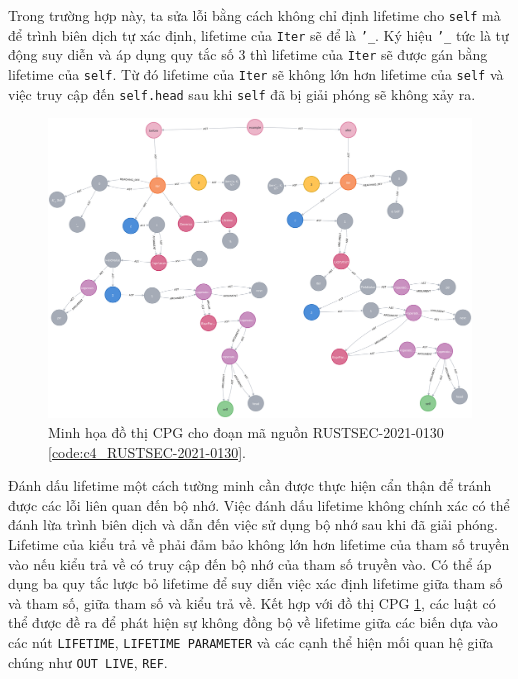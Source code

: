 Trong trường hợp này, ta sửa lỗi bằng cách không chỉ định lifetime cho \texttt{self} mà để trình biên dịch tự xác định, lifetime của \texttt{Iter} sẽ để là \texttt{'\_}.
Ký hiệu \texttt{'\_} tức là tự động suy diễn và áp dụng quy tắc số 3 thì lifetime của \texttt{Iter} sẽ được gán bằng lifetime của \texttt{self}.
Từ đó lifetime của \texttt{Iter} sẽ không lớn hơn lifetime của \texttt{self} và việc truy cập đến \texttt{self.head} sau khi \texttt{self} đã bị giải phóng sẽ không xảy ra.

\begin{figure}[H]
    \includegraphics[width=1\columnwidth]{figures/c4/c4_RUSTSEC-2021-0130.png}
    \centering
    \caption{Minh họa đồ thị CPG cho đoạn mã nguồn RUSTSEC-2021-0130 \ref{code:c4_RUSTSEC-2021-0130}.}
    \label{img:c4_RUSTSEC-2021-0130}
\end{figure}

Đánh dấu lifetime một cách tường minh cần được thực hiện cẩn thận để tránh được các lỗi liên quan đến bộ nhớ.
Việc đánh dấu lifetime không chính xác có thể đánh lừa trình biên dịch và dẫn đến việc sử dụng bộ nhớ sau khi đã giải phóng.
Lifetime của kiểu trả về phải đảm bảo không lớn hơn lifetime của tham số truyền vào nếu kiểu trả về có truy cập đến bộ nhớ của tham số truyền vào.
Có thể áp dụng ba quy tắc lược bỏ lifetime để suy diễn việc xác định lifetime giữa tham số và tham số, giữa tham số và kiểu trả về.
Kết hợp với đồ thị CPG \ref{img:c4_RUSTSEC-2021-0130}, các luật có thể được đề ra để phát hiện sự không đồng bộ về lifetime giữa các biến dựa vào các nút \texttt{LIFETIME},
\texttt{LIFETIME PARAMETER} và các cạnh thể hiện mối quan hệ giữa chúng như \texttt{OUT LIVE}, \texttt{REF}.
